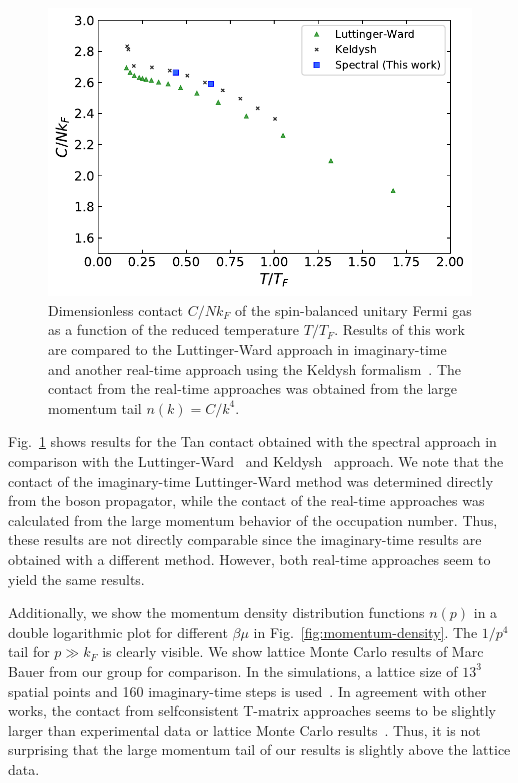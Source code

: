\begin{figure}[t]
	\centering
	\includegraphics[width=0.67\linewidth]{figs/contact.pdf}
	\caption[Contact $C/Nk_F$ of the unitary Fermi gas]{Dimensionless contact $C/Nk_F$ of the spin-balanced unitary Fermi gas as a function of the reduced temperature $T/T_F$. Results of this work are compared to the Luttinger-Ward approach in imaginary-time~\cite{Frank2018} and another real-time approach using the Keldysh formalism~\cite{Lang2023}. The contact from the real-time approaches was obtained from the large momentum tail $n(k)=C/k^4$.}
	\label{fig:contact}
\end{figure}

Fig.~\ref{fig:contact} shows results for the Tan contact obtained with the spectral approach in comparison with the Luttinger-Ward~\cite{Frank2018} and Keldysh~\cite{Lang2023} approach. We note that the contact of the imaginary-time Luttinger-Ward method was determined directly from the boson propagator, while the contact of the real-time approaches was calculated from the large momentum behavior of the occupation number. Thus, these results are not directly comparable since the imaginary-time results are obtained with a different method. However, both real-time approaches seem to yield the same results.

Additionally, we show the momentum density distribution functions $n(p)$ in a double logarithmic plot for different $\beta\mu$ in Fig.~\ref{fig:momentum-density}. The $1/p^4$ tail for $p\gg k_F$ is clearly visible. We show lattice Monte Carlo results of Marc Bauer from our group for comparison. In the simulations, a lattice size of $13^3$ spatial points and 160 imaginary-time steps is used~\cite{Bauer2023}. In agreement with other works, the contact from selfconsistent T-matrix approaches seems to be slightly larger than experimental data or lattice Monte Carlo results~\cite{Mukherjee2019}. Thus, it is not surprising that the large momentum tail of our results is slightly above the lattice data.


